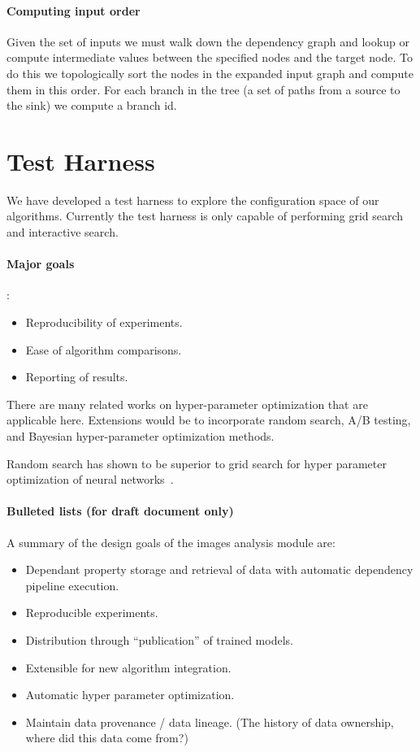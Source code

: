 \paragraph{Computing input order}
Given the set of inputs we must walk down the dependency graph and
  lookup or compute intermediate values between the specified nodes and
  the target node.
To do this we topologically sort the nodes in the expanded input graph
  and compute them in this order.
For each branch in the tree (a set of paths from a source to the sink)
  we compute a branch id.

\expandedinput{}


\section{Test Harness}\label{sec:testharn}

We have developed a test harness to explore the configuration space of
  our algorithms.
Currently the test harness is only capable of performing grid search
  and interactive search.

\paragraph{Major goals}:
\begin{itemize}
    \item Reproducibility of experiments.
    \item Ease of algorithm comparisons. 
    \item Reporting of results.
\end{itemize}
  

There are many related works on hyper-parameter optimization that are
  applicable here.
Extensions would be to incorporate random search, A/B testing, and
  Bayesian hyper-parameter optimization methods.

Random search has shown to be superior to grid search for hyper parameter
  optimization of neural networks~\cite{bergstra_random_2012}.
\cite{hutter_sequential_2011}



    \paragraph{Bulleted lists (for draft document only)}
    A summary of the design goals of the images analysis module are:
    \begin{itemize}
        \item Dependant property storage and retrieval of data with automatic
            dependency pipeline execution. 
        \item Reproducible experiments.
        \item Distribution through ``publication'' of trained models.
        \item Extensible for new algorithm integration.
        \item Automatic hyper parameter optimization.
        \item Maintain data provenance / data lineage. (The history of data ownership, where did this data come from?)
    \end{itemize}

